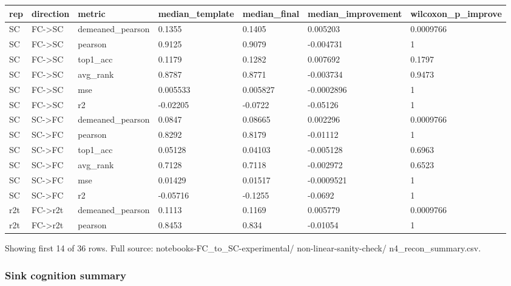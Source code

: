 {\def\LTcaptype{none} %
\begin{longtable}[]{@{}lllllll@{}}
\toprule\noalign{}
rep & direction & metric & median\_template & median\_final & median\_improvement & wilcoxon\_p\_improve \\
\midrule\noalign{}
\endhead
\bottomrule\noalign{}
\endlastfoot
SC & FC-\textgreater SC & demeaned\_pearson & 0.1355 & 0.1405 & 0.005203 & 0.0009766 \\
SC & FC-\textgreater SC & pearson & 0.9125 & 0.9079 & -0.004731 & 1 \\
SC & FC-\textgreater SC & top1\_acc & 0.1179 & 0.1282 & 0.007692 & 0.1797 \\
SC & FC-\textgreater SC & avg\_rank & 0.8787 & 0.8771 & -0.003734 & 0.9473 \\
SC & FC-\textgreater SC & mse & 0.005533 & 0.005827 & -0.0002896 & 1 \\
SC & FC-\textgreater SC & r2 & -0.02205 & -0.0722 & -0.05126 & 1 \\
SC & SC-\textgreater FC & demeaned\_pearson & 0.0847 & 0.08665 & 0.002296 & 0.0009766 \\
SC & SC-\textgreater FC & pearson & 0.8292 & 0.8179 & -0.01112 & 1 \\
SC & SC-\textgreater FC & top1\_acc & 0.05128 & 0.04103 & -0.005128 & 0.6963 \\
SC & SC-\textgreater FC & avg\_rank & 0.7128 & 0.7118 & -0.002972 & 0.6523 \\
SC & SC-\textgreater FC & mse & 0.01429 & 0.01517 & -0.0009521 & 1 \\
SC & SC-\textgreater FC & r2 & -0.05716 & -0.1255 & -0.0692 & 1 \\
r2t & FC-\textgreater r2t & demeaned\_pearson & 0.1113 & 0.1169 & 0.005779 & 0.0009766 \\
r2t & FC-\textgreater r2t & pearson & 0.8453 & 0.834 & -0.01054 & 1 \\
\end{longtable}
}

Showing first 14 of 36 rows. Full source: notebooks-FC\_to\_SC-experimental/ non-linear-sanity-check/ n4\_recon\_summary.csv.

\subsubsection{Sink cognition summary}\label{sink-cognition-summary}

